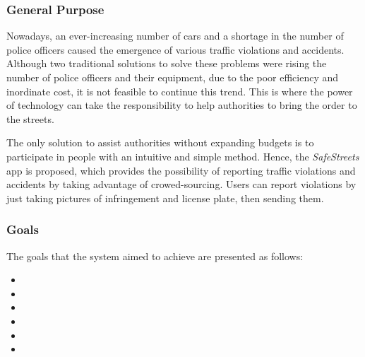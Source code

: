 \subsubsection{General Purpose}
Nowadays, an ever-increasing number of cars and a shortage in the number of police officers caused the emergence of various traffic violations and accidents. Although two traditional solutions to solve these problems were rising the number of police officers and their equipment, due to the poor efficiency and inordinate cost, it is not feasible to continue this trend. This is where the power of technology can take the responsibility to help authorities to bring the order to the streets.

The only solution to assist authorities without expanding budgets is to participate in people with an intuitive and simple method. Hence, the \emph{SafeStreets} app is proposed, which provides the possibility of reporting traffic violations and accidents by taking advantage of crowed-sourcing. Users can report violations by just taking pictures of infringement and license plate, then sending them.
\subsubsection{Goals}
The goals that the system aimed to achieve are presented as follows:
\begin{itemize}
\item  {}
\item  {}
\item  {}
\item  {}
\item  {}
\item  {}
\end{itemize}